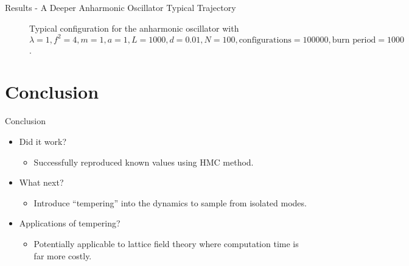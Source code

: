 \documentclass{beamer}
\begin{document}
\begin{frame}{Results - A Deeper Anharmonic Oscillator Typical Trajectory}
    \begin{figure}
    \centering
        \caption{Typical configuration for the anharmonic oscillator with $\lambda = 1, f^2 = 4, m = 1, a = 1, L = 1000, d = 0.01, N = 100, \text{configurations} = 100000, \text{burn period} = 1000$.}
    \end{figure}
\end{frame}






\section{Conclusion}
\begin{frame}{Conclusion}
\begin{itemize}
  \item<1-> Did it work? 
    \begin{itemize}
        \item Successfully reproduced known values using HMC method.
    \end{itemize}
  \item<2-> What next?
    \begin{itemize}
        \item Introduce ``tempering'' into the dynamics to sample from isolated modes.
    \end{itemize}
  \item<3-> Applications of tempering?
  \begin{itemize}
        \item Potentially applicable to lattice field theory where computation time is far more costly.
    \end{itemize}
\end{itemize}
\end{frame}
\end{document}
